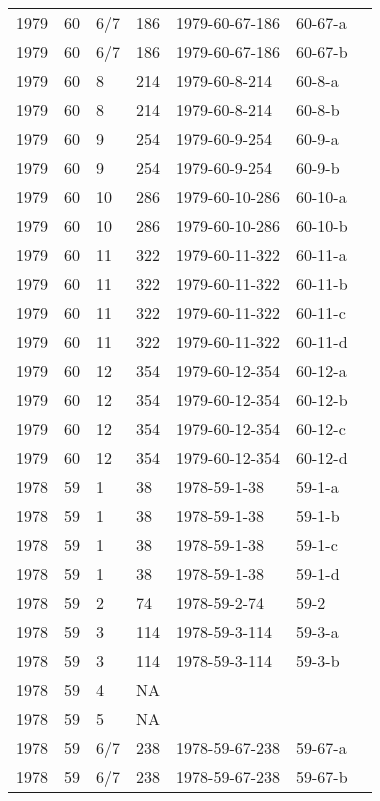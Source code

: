 \begin{longtable}{ |l|l|l|l|p{2.7cm}|l|p{2cm}| }
 1979 & 60 &   6/7 &     186 & 1979-60-67-186 & 60-67-a & \\
 1979 & 60 &   6/7 &     186 & 1979-60-67-186 & 60-67-b & \\
 1979 & 60 &     8 &     214 & 1979-60-8-214  & 60-8-a & \\
 1979 & 60 &     8 &     214 & 1979-60-8-214  & 60-8-b & \\
 1979 & 60 &     9 &     254 & 1979-60-9-254  & 60-9-a & \\
 1979 & 60 &     9 &     254 & 1979-60-9-254  & 60-9-b & \\
 1979 & 60 &    10 &     286 & 1979-60-10-286 & 60-10-a & \\
 1979 & 60 &    10 &     286 & 1979-60-10-286 & 60-10-b & \\
 1979 & 60 &    11 &     322 & 1979-60-11-322 & 60-11-a & \\
 1979 & 60 &    11 &     322 & 1979-60-11-322 & 60-11-b & \\
 1979 & 60 &    11 &     322 & 1979-60-11-322 & 60-11-c & \\
 1979 & 60 &    11 &     322 & 1979-60-11-322 & 60-11-d & \\
 1979 & 60 &    12 &     354 & 1979-60-12-354 & 60-12-a & \\
 1979 & 60 &    12 &     354 & 1979-60-12-354 & 60-12-b & \\
 1979 & 60 &    12 &     354 & 1979-60-12-354 & 60-12-c & \\
 1979 & 60 &    12 &     354 & 1979-60-12-354 & 60-12-d & \\
 1978 & 59 &     1 &      38 & 1978-59-1-38   & 59-1-a & \\
 1978 & 59 &     1 &      38 & 1978-59-1-38   & 59-1-b & \\
 1978 & 59 &     1 &      38 & 1978-59-1-38   & 59-1-c & \\
 1978 & 59 &     1 &      38 & 1978-59-1-38   & 59-1-d & \\
 1978 & 59 &     2 &      74 & 1978-59-2-74   & 59-2 & \\
 1978 & 59 &     3 &     114 & 1978-59-3-114  & 59-3-a & \\
 1978 & 59 &     3 &     114 & 1978-59-3-114  & 59-3-b & \\
 1978 & 59 &     4 &      NA &                &  & \\
 1978 & 59 &     5 &      NA &                &  & \\
 1978 & 59 &   6/7 &     238 & 1978-59-67-238 & 59-67-a & \\
 1978 & 59 &   6/7 &     238 & 1978-59-67-238 & 59-67-b & \\

\end{longtable}

